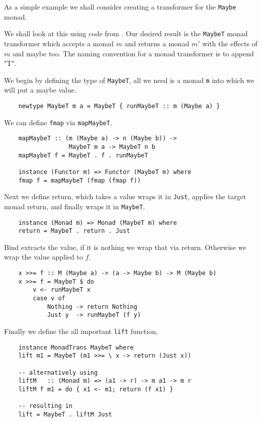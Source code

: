\begin{example}
    As a simple example we shall consider
    creating a transformer for the \texttt{Maybe} monad.

    We shall look at this using code from \cite{haskellT}.
    Our desired result is the \texttt{MaybeT} monad transformer
    which accepts a monad $m$ and returns a monad $m\prime$
    with the effects of $m$ and maybe too.
    The naming convention for a monad transformer is to append "T".

    We begin by defining the type of \texttt{MaybeT},
    all we need is a monad \texttt{m} into which we will
    put a maybe value.
    \begin{verbatim}
    newtype MaybeT m a = MaybeT { runMaybeT :: m (Maybe a) }\end{verbatim}

    We can define \texttt{fmap} via \texttt{mapMaybeT}.
    \begin{verbatim}
    mapMaybeT :: (m (Maybe a) -> n (Maybe b)) ->
                  MaybeT m a -> MaybeT n b
    mapMaybeT f = MaybeT . f . runMaybeT

    instance (Functor m) => Functor (MaybeT m) where
    fmap f = mapMaybeT (fmap (fmap f))\end{verbatim}
    Next we define return,
    which takes a value wraps it in \texttt{Just},
    applies the target monad return,
    and finally wraps it in \texttt{MaybeT}.
    \begin{verbatim}
    instance (Monad m) => Monad (MaybeT m) where
    return = MaybeT . return . Just\end{verbatim}

    Bind extracts the value,
    if it is nothing we wrap that via return.
    Otherwise we wrap the value applied to $f$.
    \begin{verbatim}
    x >>= f :: M (Maybe a) -> (a -> Maybe b) -> M (Maybe b)
    x >>= f = MaybeT $ do
        v <- runMaybeT x
        case v of
            Nothing -> return Nothing
            Just y  -> runMaybeT (f y)\end{verbatim}
    Finally we define the all important \texttt{lift} function,
    \begin{verbatim}
    instance MonadTrans MaybeT where
    lift m1 = MaybeT (m1 >>= \ x -> return (Just x))

    -- alternatively using
    liftM   :: (Monad m) => (a1 -> r) -> m a1 -> m r
    liftM f m1 = do { x1 <- m1; return (f x1) }

    -- resulting in
    lift = MaybeT . liftM Just\end{verbatim}
\end{example}

